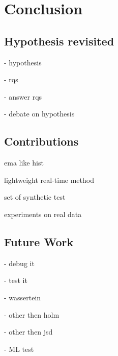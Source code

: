 \chapter{Conclusion} \label{chap:conclusion} \minitoc

\section{Hypothesis revisited}

- hypothesis

- rqs

- answer rqs

- debate on hypothesis

\section{Contributions}
ema like hist

lightweight real-time method

set of synthetic test

experiments on real data

\section{Future Work}

- debug it

- test it

- wassertein

- other then holm

- other then jsd

- ML test

